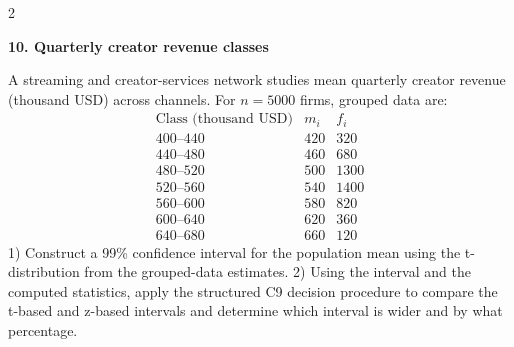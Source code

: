 \documentclass[12pt]{article}
\newcommand{\SubsectionBox}[1]{%
\noindent\colorbox{gray!30}{%
\parbox{\dimexpr\linewidth-2\fboxsep\relax}{\textbf{#1}}%
}\par\vspace{0.35cm}%
}
\begin{document}
\begin{multicols}{2}
		\vspace{0.25cm}
		\SubsectionBox{10. Quarterly creator revenue classes}\vspace{-0.25cm}
		A streaming and creator-services network studies mean quarterly creator revenue (thousand USD) across channels.
		For $n=5000$ firms, grouped data are:
		\[
		\begin{array}{c|c|c}
		\text{Class (thousand USD)} & m_i & f_i\\\hline
		400\text{--}440 & 420 & 320\\
		440\text{--}480 & 460 & 680\\
		480\text{--}520 & 500 & 1300\\
		520\text{--}560 & 540 & 1400\\
		560\text{--}600 & 580 & 820\\
		600\text{--}640 & 620 & 360\\
		640\text{--}680 & 660 & 120
		\end{array}
		\]
		1) Construct a 99\% confidence interval for the population mean using the t-distribution from the grouped-data estimates.
		2) Using the interval and the computed statistics, apply the structured C9 decision procedure to compare the t-based and z-based intervals and determine which interval is wider and by what percentage.
		
	\end{multicols}
	
\end{document}
